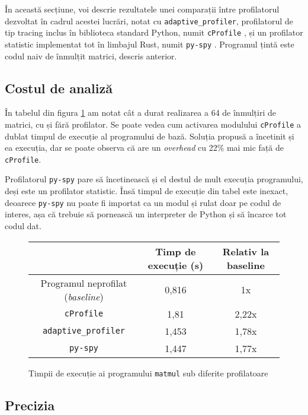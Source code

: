 În această secțiune, voi descrie rezultatele unei comparații între profilatorul dezvoltat în cadrul acestei lucrări, notat cu \texttt{adaptive\_profiler}, profilatorul de tip tracing inclus în biblioteca standard Python, numit \texttt{cProfile} \cite{cprofile_user_manual}, și un profilator statistic implementat tot în limbajul Rust, numit \texttt{py-spy} \cite{py_spy}. Programul țintă este codul naiv de înmulțit matrici, descris anterior.

\subsection{Costul de analiză}

În tabelul din figura \ref{fig:profiler_overhead} am notat cât a durat realizarea a 64 de înmulțiri de matrici, cu și fără profilator. Se poate vedea cum activarea modulului \texttt{cProfile} a dublat timpul de execuție al programului de bază. Soluția propusă a încetinit și ea execuția, dar se poate observa că are un \textit{overhead} cu 22\% mai mic față de \texttt{cProfile}.

Profilatorul \texttt{py-spy} pare să încetinească și el destul de mult execuția programului, deși este un profilator statistic. Însă timpul de execuție din tabel este inexact, deoarece \texttt{py-spy} nu poate fi importat ca un modul și rulat doar pe codul de interes, așa că trebuie să pornească un interpreter de Python și să încarce tot codul dat.

\begin{figure}[h]
    \centering
    \begin{tabular}{ |c|c|c| }
        \cline{2-3}
        \multicolumn{1}{c|}{} & Timp de execuție (s) & Relativ la baseline \\
        \hline
        Programul neprofilat (\textit{baseline}) & 0,816 & 1x \\
        \hline
        \texttt{cProfile} & 1,81 & 2,22x \\
        \hline
        \texttt{adaptive\_profiler} & 1,453 & 1,78x \\ 
        \hline
        \texttt{py-spy} & 1,447 & 1,77x \\
        \hline
    \end{tabular}
    \caption{Timpii de execuție ai programului \texttt{matmul} sub diferite profilatoare}
    \label{fig:profiler_overhead}
\end{figure}

\subsection{Precizia}

